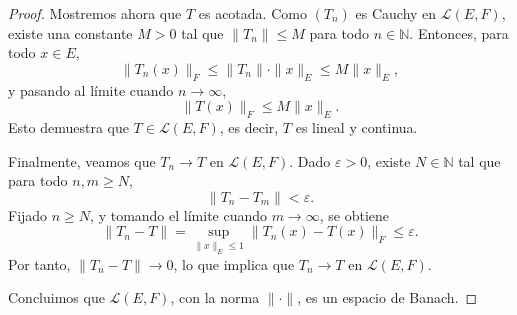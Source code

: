 \begin{proof}
Mostremos ahora que \( T \) es acotada. Como \( (T_n) \) es Cauchy en \( \mathcal{L}(E, F) \), existe una constante \( M > 0 \) tal que \( \|T_n\| \leq M \) para todo \( n \in \mathbb{N} \). Entonces, para todo \( x \in E \),
\[
\|T_n(x)\|_F \leq \|T_n\| \cdot \|x\|_E \leq M \|x\|_E,
\]
y pasando al límite cuando \( n \to \infty \),
\[
\|T(x)\|_F \leq M \|x\|_E.
\]
Esto demuestra que \( T \in \mathcal{L}(E, F) \), es decir, \( T \) es lineal y continua.

Finalmente, veamos que \( T_n \to T \) en \( \mathcal{L}(E, F) \). Dado \( \varepsilon > 0 \), existe \( N \in \mathbb{N} \) tal que para todo \( n, m \geq N \),
\[
\|T_n - T_m\| < \varepsilon.
\]
Fijado \( n \geq N \), y tomando el límite cuando \( m \to \infty \), se obtiene
\[
\|T_n - T\| = \sup_{\|x\|_E \leq 1} \|T_n(x) - T(x)\|_F \leq \varepsilon.
\]
Por tanto, \( \|T_n - T\| \to 0 \), lo que implica que \( T_n \to T \) en \( \mathcal{L}(E, F) \).

\medskip

Concluimos que \( \mathcal{L}(E, F) \), con la norma \( \|\cdot\| \), es un espacio de Banach.
\end{proof}